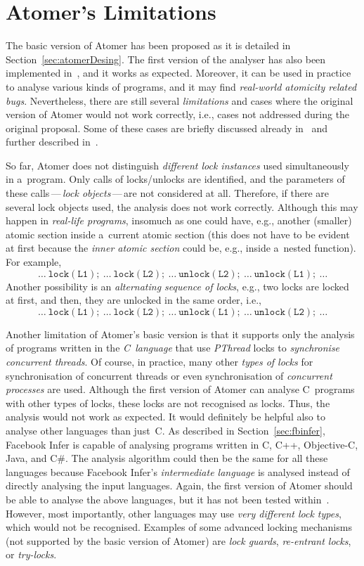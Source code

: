 \section{Atomer's Limitations}
\label{sec:atomerLimits}

The basic version of Atomer has been proposed as it is detailed in Section~\ref{sec:atomerDesing}. The first version of the analyser has also been implemented in~\cite{harmimBP}, and it works as expected. Moreover, it can be used in practice to analyse various kinds of programs, and it may find \emph{real-world atomicity related bugs}. Nevertheless, there are still several \emph{limitations} and cases where the original version of Atomer would not work correctly, i.e., cases not addressed during the original proposal. Some of these cases are briefly discussed already in~\cite{harmimBP} and further described in~\cite{excel2021Harmim}.

So far, Atomer does not distinguish \emph{different lock instances} used simultaneously in a~program. Only calls of locks/unlocks are identified, and the parameters of these calls\,---\,\emph{lock objects}\,---\,are not considered at all. Therefore, if there are several lock objects used, the analysis does not work correctly. Although this may happen in \emph{real-life programs}, insomuch as one could have, e.g., another (smaller) atomic section inside a~current atomic section (this does not have to be evident at first because the \emph{inner atomic section} could be, e.g., inside a~nested function). For example,
$$
    \mathtt{\ldots\ lock(L1);\ \ldots\ lock(L2);\ \ldots\ unlock(L2);\ \ldots\ unlock(L1);\ \ldots}
$$
Another possibility is an \emph{alternating sequence of locks}, e.g., two locks are locked at first, and then, they are unlocked in the same order, i.e.,
$$
    \mathtt{\ldots\ lock(L1);\ \ldots\ lock(L2);\ \ldots\ unlock(L1);\ \ldots\ unlock(L2);\ \ldots}
$$

Another limitation of Atomer's basic version is that it supports only the analysis of programs written in the \emph{C~language} that use \emph{PThread} locks to \emph{synchronise concurrent threads}. Of course, in practice, many other \emph{types of locks} for synchronisation of concurrent threads or even synchronisation of \emph{concurrent processes} are used. Although the first version of Atomer can analyse C~programs with other types of locks, these locks are not recognised as locks. Thus, the analysis would not work as expected. It would definitely be helpful also to analyse other languages than just~C. As described in Section~\ref{sec:fbinfer}, Facebook Infer is capable of analysing programs written in C, C++, Objective-C, Java, and C\#. The analysis algorithm could then be the same for all these languages because Facebook Infer's \emph{intermediate language} is analysed instead of directly analysing the input languages. Again, the first version of Atomer should be able to analyse the above languages, but it has not been tested within~\cite{harmimBP}. However, most importantly, other languages may use \emph{very different lock types}, which would not be recognised. Examples of some advanced locking mechanisms (not supported by the basic version of Atomer) are \emph{lock guards}, \emph{re-entrant locks}, or \emph{try-locks}.

